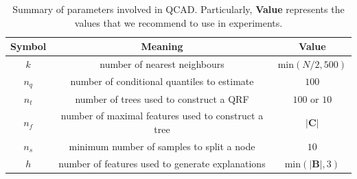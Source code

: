 \documentclass[pdflatex,sn-basic]{sn-jnl}%
\theoremstyle{thmstyleone}%
\theoremstyle{thmstyletwo}%
\theoremstyle{thmstylethree}%
\begin{document}
\begin{table}
  \caption{Summary of parameters involved in QCAD. Particularly, \textbf{Value} represents the values that we recommend to use in experiments.}
  \label{tab:parameters}
  \centering
  \begin{tabular}{ccc}
    \toprule
    \textbf{Symbol} & \textbf{Meaning}  & \textbf{Value}\\
    \midrule
    $k$ & number of nearest neighbours & $\mathrm{min}(N/2,500)$\\
    $n_q$ & number of conditional quantiles to estimate & $100$\\    
    $n_t$ & number of trees used to construct a QRF & $100$ or $10$\\    
    $n_f$ & number of maximal features used to construct a tree & $\vert\mathbf{C}\vert$\\  
    $n_s$ & minimum number of samples to split a node  & $10$\\ 
    $h$ & number of features used to generate explanations  & $\mathrm{min}(\vert \mathbf{B} \vert,3)$\\ 
  \bottomrule
\end{tabular}
\end{table}
\end{document}
